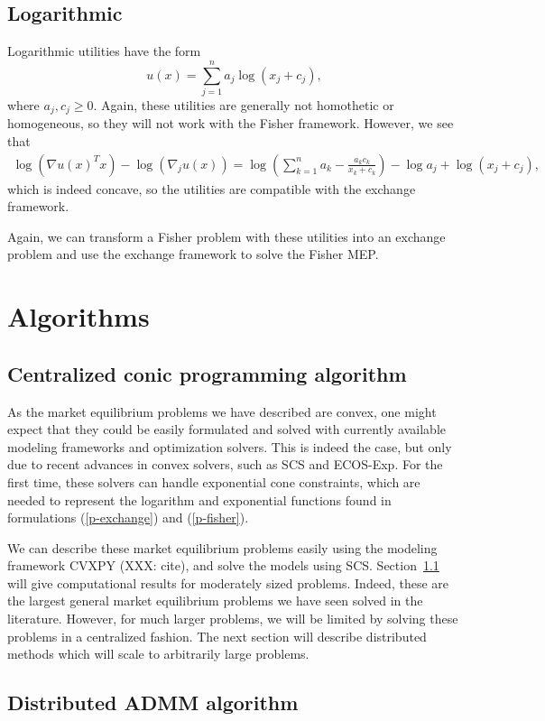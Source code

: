 \documentclass[12pt]{article}
\begin{document}
\subsection{Logarithmic}
Logarithmic utilities have the form
\[
u(x) = \sum_{j=1}^n a_j \log(x_j+ c_j),
\]
where $a_j, c_j \geq 0$.
Again, these utilities are generally not homothetic or
homogeneous, so they will not work with the Fisher framework.
However, we see that 
\begin{align*}
\log(\nabla u(x)^T x) - \log(\nabla_j u(x)) =
\log\left(\sum_{k=1}^n a_k - \frac{a_k c_k}{x_k+c_k} \right) - \log a_j + \log (x_j + c_j),
\end{align*}
which is indeed concave, so the utilities are compatible
with the exchange framework.

Again, we can transform a Fisher problem with these utilities into
an exchange problem and use the exchange framework to solve
the Fisher MEP.

\section{Algorithms}
\subsection{Centralized conic programming algorithm}
\label{sec:centralized}
As the market equilibrium problems we have described are convex, one might expect that they could be easily formulated and solved with currently
available modeling frameworks and optimization solvers.
This is indeed the case, but only due to recent advances in convex solvers,
such as SCS and ECOS-Exp. %
For the first time, these solvers can handle exponential cone constraints,
which are needed to represent the logarithm and exponential functions found in 
formulations (\ref{p-exchange}) and (\ref{p-fisher}).

We can describe these market equilibrium problems easily using the modeling
framework CVXPY (XXX: cite), and solve the models using SCS. Section~\ref{sec:centralized} will give computational results for moderately sized problems. Indeed, these are the largest general market equilibrium problems we have seen solved in the literature. However, for much larger problems, we will
be limited by solving these problems in a centralized fashion. The next section will describe distributed methods which will scale to arbitrarily large problems.


\subsection{Distributed ADMM algorithm}
\label{sec:distributed}
\end{document}

